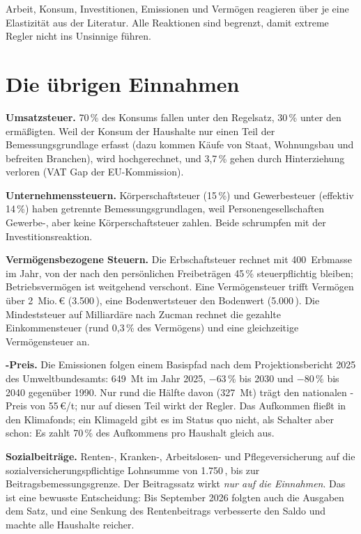 \begin{merksatz}
Arbeit, Konsum, Investitionen, Emissionen und Vermögen reagieren über je eine Elastizität aus
der Literatur. Alle Reaktionen sind begrenzt, damit extreme Regler nicht ins Unsinnige
führen.
\end{merksatz}

\section{Die übrigen Einnahmen}

\textbf{Umsatzsteuer.} 70\,\% des Konsums fallen unter den Regelsatz, 30\,\% unter den
ermäßigten. Weil der Konsum der Haushalte nur einen Teil der Bemessungsgrundlage erfasst
(dazu kommen Käufe von Staat, Wohnungsbau und befreiten Branchen), wird hochgerechnet, und
3,7\,\% gehen durch Hinterziehung verloren (VAT Gap der EU-Kommission).

\textbf{Unternehmenssteuern.} Körperschaftsteuer (15\,\%) und Gewerbesteuer (effektiv 14\,\%)
haben getrennte Bemessungsgrundlagen, weil Personengesellschaften Gewerbe-, aber keine
Körperschaftsteuer zahlen. Beide schrumpfen mit der Investitionsreaktion.

\textbf{Vermögensbezogene Steuern.} Die Erbschaftsteuer rechnet mit 400\,\Mrd{} Erbmasse im
Jahr, von der nach den persönlichen Freibeträgen 45\,\% steuerpflichtig bleiben;
Betriebsvermögen ist weitgehend verschont. Eine Vermögensteuer trifft Vermögen über
2~Mio.\,\euro{} (3.500\,\Mrd), eine Bodenwertsteuer den Bodenwert (5.000\,\Mrd). Die
Mindeststeuer auf Milliardäre nach Zucman rechnet die gezahlte Einkommensteuer (rund 0,3\,\%
des Vermögens) und eine gleichzeitige Vermögensteuer an.

\textbf{\COz-Preis.} Die Emissionen folgen einem Basispfad nach dem Projektionsbericht 2025
des Umweltbundesamts: 649~Mt im Jahr 2025, $-63\,\%$ bis 2030 und $-80\,\%$ bis 2040 gegenüber
1990. Nur rund die Hälfte davon (327~Mt) trägt den nationalen \COz-Preis von 55\,\euro{}/t;
nur auf diesen Teil wirkt der Regler. Das Aufkommen fließt in den Klimafonds; ein Klimageld
gibt es im Status quo nicht, als Schalter aber schon: Es zahlt 70\,\% des Aufkommens pro
Haushalt gleich aus.

\textbf{Sozialbeiträge.} Renten-, Kranken-, Arbeitslosen- und Pflegeversicherung auf die
sozialversicherungspflichtige Lohnsumme von 1.750\,\Mrd, bis zur Beitragsbemessungsgrenze.
Der Beitragssatz wirkt \emph{nur auf die Einnahmen}. Das ist eine bewusste Entscheidung: Bis
September 2026 folgten auch die Ausgaben dem Satz, und eine Senkung des Rentenbeitrags
verbesserte den Saldo und machte alle Haushalte reicher.

